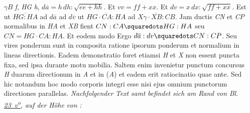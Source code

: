 $\gamma B$
\textit{f}, \textit{HG}
\textit{h},
$d\overline{a} = h\,dh: \sqrt{ee + hh}$. Et $vv = ff + xx$. Et $dv = x\,dx: \sqrt{ff + xx}$. Est 
ut $\overline{HG : HA}$ ad
$d\overline{a}$ ad $d\overline{v}$ ut $\overline{HG\cdot CA : HA}$ ad $\overline{X\gamma\cdot XB : CB}$. Jam ductis \textit{CN} et \textit{CP} normalibus in \textit{HA} et \textit{XB} fient $CN : CA \squaredots HG : HA$ seu $CN = HG\cdot CA : HA$. Et eodem modo
Ergo $d\overline{a} : dv \squaredots CN : CP$. Seu vires ponderum sunt in composita ratione ipsorum ponderum et normalium in lineas directionis. Eadem demonstratio foret etiamsi \textit{H} et \textit{X} non essent puncta fixa, sed ipsa durante motu mobilia. Saltem enim invenietur punctum concursus \textit{H} duarum directionum in \textit{A} et in (\textit{A}) et eadem erit ratiocinatio quae ante. Sed hic notandum hoc modo corporis integri
esse
nisi ejus omnium punctorum directiones parallelas.
\pend
\vspace{.5em}%
\pstart
\noindent
\lbrack\textit{Nachfolgender Text samt  befindet sich am Rand von Bl.\;%
\href{\Scan{LH_035_14_02_023v}}%
{23~v\textsuperscript{o}}, auf der Höhe von :}\rbrack
\pend

